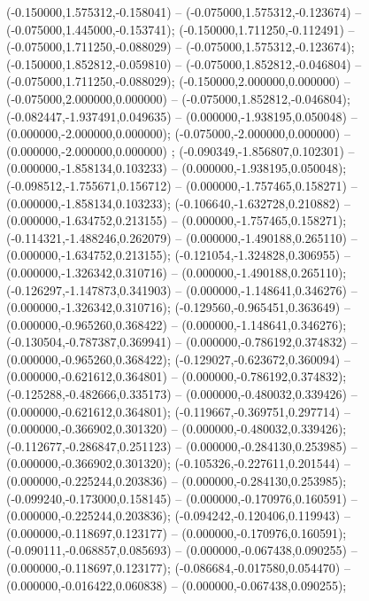  (-0.150000,1.575312,-0.158041) -- (-0.075000,1.575312,-0.123674) -- (-0.075000,1.445000,-0.153741);
 (-0.150000,1.711250,-0.112491) -- (-0.075000,1.711250,-0.088029) -- (-0.075000,1.575312,-0.123674);
 (-0.150000,1.852812,-0.059810) -- (-0.075000,1.852812,-0.046804) -- (-0.075000,1.711250,-0.088029);
 (-0.150000,2.000000,0.000000) -- (-0.075000,2.000000,0.000000) -- (-0.075000,1.852812,-0.046804);
 (-0.082447,-1.937491,0.049635) -- (0.000000,-1.938195,0.050048) -- (0.000000,-2.000000,0.000000);
 (-0.075000,-2.000000,0.000000) -- (0.000000,-2.000000,0.000000) ;
 (-0.090349,-1.856807,0.102301) -- (0.000000,-1.858134,0.103233) -- (0.000000,-1.938195,0.050048);
 (-0.098512,-1.755671,0.156712) -- (0.000000,-1.757465,0.158271) -- (0.000000,-1.858134,0.103233);
 (-0.106640,-1.632728,0.210882) -- (0.000000,-1.634752,0.213155) -- (0.000000,-1.757465,0.158271);
 (-0.114321,-1.488246,0.262079) -- (0.000000,-1.490188,0.265110) -- (0.000000,-1.634752,0.213155);
 (-0.121054,-1.324828,0.306955) -- (0.000000,-1.326342,0.310716) -- (0.000000,-1.490188,0.265110);
 (-0.126297,-1.147873,0.341903) -- (0.000000,-1.148641,0.346276) -- (0.000000,-1.326342,0.310716);
 (-0.129560,-0.965451,0.363649) -- (0.000000,-0.965260,0.368422) -- (0.000000,-1.148641,0.346276);
 (-0.130504,-0.787387,0.369941) -- (0.000000,-0.786192,0.374832) -- (0.000000,-0.965260,0.368422);
 (-0.129027,-0.623672,0.360094) -- (0.000000,-0.621612,0.364801) -- (0.000000,-0.786192,0.374832);
 (-0.125288,-0.482666,0.335173) -- (0.000000,-0.480032,0.339426) -- (0.000000,-0.621612,0.364801);
 (-0.119667,-0.369751,0.297714) -- (0.000000,-0.366902,0.301320) -- (0.000000,-0.480032,0.339426);
 (-0.112677,-0.286847,0.251123) -- (0.000000,-0.284130,0.253985) -- (0.000000,-0.366902,0.301320);
 (-0.105326,-0.227611,0.201544) -- (0.000000,-0.225244,0.203836) -- (0.000000,-0.284130,0.253985);
 (-0.099240,-0.173000,0.158145) -- (0.000000,-0.170976,0.160591) -- (0.000000,-0.225244,0.203836);
 (-0.094242,-0.120406,0.119943) -- (0.000000,-0.118697,0.123177) -- (0.000000,-0.170976,0.160591);
 (-0.090111,-0.068857,0.085693) -- (0.000000,-0.067438,0.090255) -- (0.000000,-0.118697,0.123177);
 (-0.086684,-0.017580,0.054470) -- (0.000000,-0.016422,0.060838) -- (0.000000,-0.067438,0.090255);
